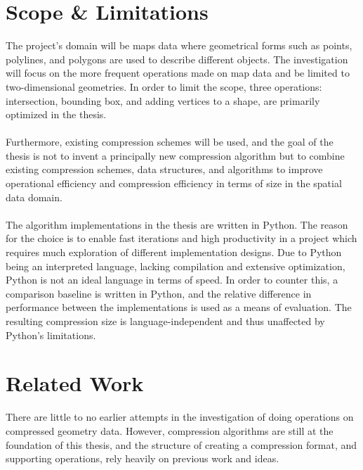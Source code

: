 \section{Scope \& Limitations}
The project's domain will be maps data where geometrical forms such as points, polylines, and polygons are used to describe different objects. The investigation will focus on the more frequent operations made on map data and be limited to two-dimensional geometries. In order to limit the scope, three operations: intersection, bounding box, and adding vertices to a shape, are primarily optimized in the thesis.
\\\\
Furthermore, existing compression schemes will be used, and the goal of the thesis is not to invent a principally new compression algorithm but to combine existing compression schemes, data structures, and algorithms to improve operational efficiency and compression efficiency in terms of size in the spatial data domain.
\\\\
The algorithm implementations in the thesis are written in Python. The reason for the choice is to enable fast iterations and high productivity in a project which requires much exploration of different implementation designs. Due to Python being an interpreted language, lacking compilation and extensive optimization, Python is not an ideal language in terms of speed. In order to counter this, a comparison baseline is written in Python, and the relative difference in performance between the implementations is used as a means of evaluation. The resulting compression size is language-independent and thus unaffected by Python's limitations.

\section{Related Work}
There are little to no earlier attempts in the investigation of doing operations on compressed geometry data. However, compression algorithms are still at the foundation of this thesis, and the structure of creating a compression format, and supporting operations, rely heavily on previous work and ideas.

